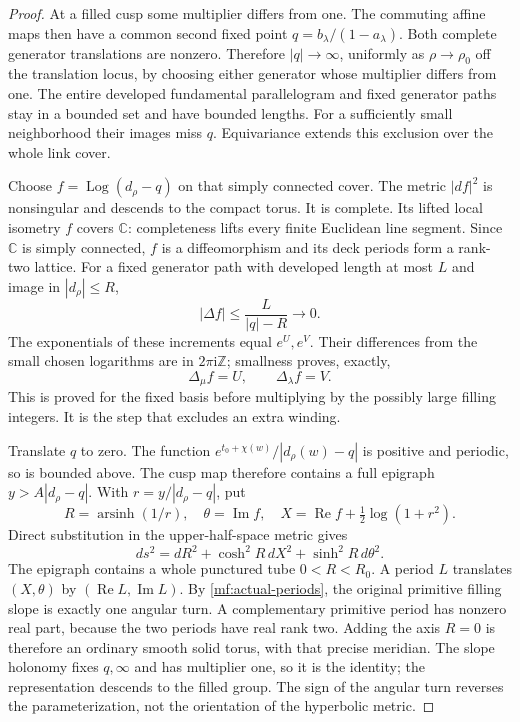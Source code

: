 \documentclass[11pt]{article}
\numberwithin{equation}{section}
\theoremstyle{definition}
\theoremstyle{remark}
\newcommand{\ii}{\mathrm i}
\newcommand{\Rea}{\operatorname{Re}}
\newcommand{\Ima}{\operatorname{Im}}
\newcommand{\Log}{\operatorname{Log}}
\begin{document}
\begin{proof}
At a filled cusp some multiplier differs from one. The commuting
affine maps then have a common second fixed point
\(q=b_\lambda/(1-a_\lambda)\). Both complete generator translations
are nonzero. Therefore \(|q|\to\infty\), uniformly as \(\rho\to\rho_0\)
off the translation locus, by choosing either generator whose
multiplier differs from one. The entire developed fundamental
parallelogram and fixed generator paths stay in a bounded set and
have bounded lengths. For a sufficiently small neighborhood their
images miss \(q\). Equivariance extends this exclusion over the
whole link cover.

Choose \(f=\Log(d_\rho-q)\) on that simply connected cover.
The metric \(|df|^2\) is nonsingular and descends to the compact
torus. It is complete. Its lifted local isometry \(f\) covers
\(\mathbb C\): completeness lifts every finite Euclidean line
segment. Since \(\mathbb C\) is simply connected, \(f\) is a
diffeomorphism and its deck periods form a rank-two lattice.
For a fixed generator path with developed length at most \(L\)
and image in \(|d_\rho|\le R\),
\[
                  |\Delta f|\le\frac{L}{|q|-R}\longrightarrow0 .
\]
The exponentials of these increments equal \(e^U,e^V\). Their
differences from the small chosen logarithms are in \(2\pi\ii\mathbb Z\);
smallness proves, exactly,
\begin{equation}\label{mf:actual-periods}
                    \Delta_\mu f=U,\qquad \Delta_\lambda f=V.
\end{equation}
This is proved for the fixed basis before multiplying by the possibly
large filling integers. It is the step that excludes an extra winding.

Translate \(q\) to zero. The function
\(e^{t_0+\chi(w)}/|d_\rho(w)-q|\) is positive and periodic, so is
bounded above. The cusp map therefore contains a full epigraph
\(y>A|d_\rho-q|\). With \(r=y/|d_\rho-q|\), put
\[
 R=\operatorname{arsinh}(1/r),\quad
 \theta=\Ima f,\quad
 X=\Rea f+\tfrac12\log(1+r^2).
\]
Direct substitution in the upper-half-space metric gives
\begin{equation}\label{mf:tube-metric}
 ds^2=dR^2+\cosh^2R\,dX^2+\sinh^2R\,d\theta^2 .
\end{equation}
The epigraph contains a whole punctured tube \(0<R<R_0\).
A period \(L\) translates \((X,\theta)\) by
\((\Rea L,\Ima L)\). By \eqref{mf:actual-periods}, the original
primitive filling slope is exactly one angular turn. A complementary
primitive period has nonzero real part, because the two periods have
real rank two. Adding the axis \(R=0\) is therefore an ordinary
smooth solid torus, with that precise meridian. The slope holonomy
fixes \(q,\infty\) and has multiplier one, so it is the identity;
the representation descends to the filled group.
The sign of the angular turn reverses the parameterization, not the
orientation of the hyperbolic metric.


\end{proof}
\end{document}
